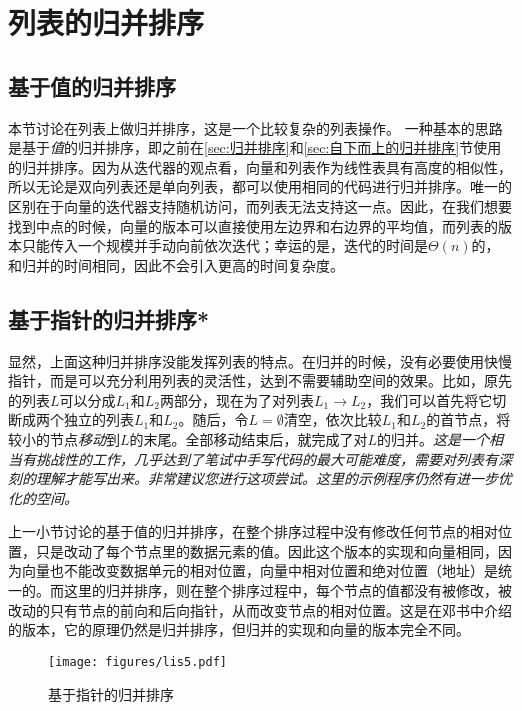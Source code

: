 \section{列表的归并排序}

\subsection{基于值的归并排序}

本节讨论在列表上做归并排序，这是一个比较复杂的列表操作。
一种基本的思路是基于\textit{值}的归并排序，即之前在\ref{sec:归并排序}和\ref{sec:自下而上的归并排序}节使用的归并排序。因为从迭代器的观点看，向量和列表作为线性表具有高度的相似性，所以无论是双向列表还是单向列表，都可以使用相同的代码进行归并排序。唯一的区别在于向量的迭代器支持随机访问，而列表无法支持这一点。因此，在我们想要找到中点的时候，向量的版本可以直接使用左边界和右边界的平均值，而列表的版本只能传入一个规模并手动向前依次迭代；幸运的是，迭代的时间是$\Theta(n)$的，和归并的时间相同，因此不会引入更高的时间复杂度。

\subsection{基于指针的归并排序*}

显然，上面这种归并排序没能发挥列表的特点。在归并的时候，没有必要使用快慢指针，而是可以充分利用列表的灵活性，达到不需要辅助空间的效果。比如，原先的列表$L$可以分成$L_1$和$L_2$两部分，现在为了对列表$L_1\rightarrow L_2$，我们可以首先将它切断成两个独立的列表$L_1$和$L_2$。随后，令$L=\emptyset$清空，依次比较$L_1$和$L_2$的首节点，将较小的节点\textit{移动}到$L$的末尾。全部移动结束后，就完成了对$L$的归并。\textit{这是一个相当有挑战性的工作，几乎达到了笔试中手写代码的最大可能难度，需要对列表有深刻的理解才能写出来。非常建议您进行这项尝试。这里的示例程序仍然有进一步优化的空间。}

上一小节讨论的基于值的归并排序，在整个排序过程中没有修改任何节点的相对位置，只是改动了每个节点里的数据元素的值。因此这个版本的实现和向量相同，因为向量也不能改变数据单元的相对位置，向量中相对位置和绝对位置（地址）是统一的。而这里的归并排序，则在整个排序过程中，每个节点的值都没有被修改，被改动的只有节点的前向和后向指针，从而改变节点的相对位置。这是在邓书中介绍的版本，它的原理仍然是归并排序，但归并的实现和向量的版本完全不同。
\begin{figure}[H]
  \centering
  \texttt{[image: figures/lis5.pdf]}
  \caption{基于指针的归并排序}
  \label{fig:lis5}
\end{figure}

